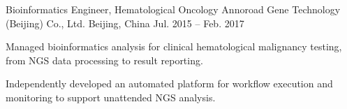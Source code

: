 \begin{cventries}
  \cventry
    {Bioinformatics Engineer, Hematological Oncology}
    {Annoroad Gene Technology (Beijing) Co., Ltd.}
    {Beijing, China}
    {Jul. 2015 -- Feb. 2017}
    {
      \begin{cvitems}
        \item {Managed bioinformatics analysis for clinical hematological malignancy testing, from NGS data processing to result reporting.}
        \item {Independently developed an automated platform for workflow execution and monitoring to support unattended NGS analysis.}
      \end{cvitems}
    }
\end{cventries}
